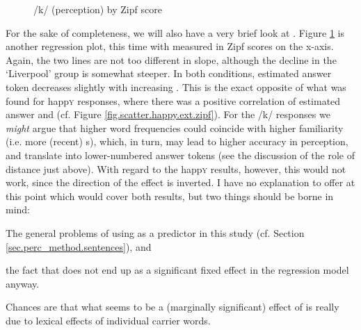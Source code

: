 \begin{figure}[h]
	\centering
		\resizebox{.49\linewidth}{!}{} 
	\caption{/k/ (perception) by Zipf score}
	\label{fig.scatter.k.ext.zipf}
\end{figure}

For the sake of completeness, we will also have a very brief look at .
Figure \ref{fig.scatter.k.ext.zipf} is another regression plot, this time with  measured in Zipf scores on the x-axis.
Again, the two lines are not too different in slope, although the decline in the `Liverpool' group is somewhat steeper.
In both  conditions, estimated answer token decreases slightly with increasing .
This is the exact opposite of what was found for happ\textsc{y} responses, where there was a positive correlation of estimated answer and  (cf. Figure \ref{fig.scatter.happy.ext.zipf}).
For the /k/ responses we \emph{might} argue that higher word frequencies could coincide with higher familiarity (i.e. more (recent) s), which, in turn, may lead to higher accuracy in perception, and translate into lower-numbered answer tokens (see the discussion of the role of distance just above).
With regard to the happ\textsc{y} results, however, this would not work, since the direction of the effect is inverted.
I have no explanation to offer at this point which would cover both results, but two things should be borne in mind:
\begin{inparaenum}[(a)]
	\item The general problems of using  as a predictor in this study (cf. Section \ref{sec.perc_method.sentences}), and
	\item the fact that  does not end up as a significant fixed effect in the regression model anyway.
\end{inparaenum}
Chances are that what seems to be a (marginally significant) effect of  is really due to lexical effects of individual carrier words.